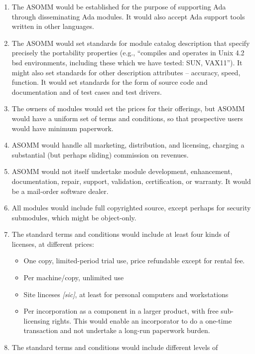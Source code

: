 \documentclass[12pt,final]{article}
\begin{document}
\begin{enumerate}
    \item The ASOMM would be established for the purpose of supporting Ada
        through disseminating Ada modules. It would also accept Ada support
        tools written in other languages.
    \item The ASOMM would set standards for module catalog description that
        specify precisely the portability properties (e.g., “compiles and
        operates in Unix 4.2 bsd environments, including these which we have
        tested: SUN, VAX11”). It might also set standards for other description
        attributes – accuracy, speed, function. It would set standards for the
        form of source code and documentation and of test cases and test
        drivers.
    \item The owners of modules would set the prices for their offerings, but
        ASOMM would have a uniform set of terms and conditions, so that
        prospective users would have minimum paperwork.
    \item ASOMM would handle all marketing, distribution, and licensing,
        charging a substantial (but perhaps sliding) commission on revenues.
    \item ASOMM would not itself undertake module development, enhancement,
        documentation, repair, support, validation, certification, or warranty.
        It would be a mail-order software dealer.
    \item All modules would include full copyrighted source, except perhaps for
        security submodules, which might be object-only.
    \item The standard terms and conditions would include at least four kinds
        of licenses, at different prices:
\begin{itemize}
        \item One copy, limited-period trial use, price refundable except for
            rental fee.
        \item Per machine/copy, unlimited use
        \item Site linceses \emph{[sic]}, at least for personal computers and
            workstations
        \item Per incorporation as a component in a larger product, with free
            sub-licensing rights. This would enable an incorporator to do a
            one-time transaction and not undertake a long-run paperwork burden.
\end{itemize}
    \item The standard terms and conditions would include different levels of

\end{enumerate}
\end{document}
